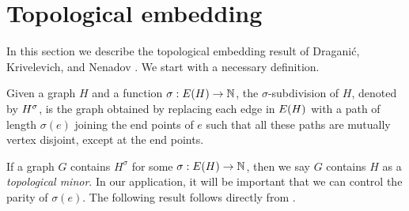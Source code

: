 \documentclass[11pt]{article}
\begin{document}




\section{Topological embedding}
\label{sec:embed-machinery}

In this section we describe the topological embedding result of Dragani\'c, Krivelevich, and Nenadov \cite{draganic22rolling}. We start with a necessary definition.

\begin{definition}\label{def:subdivisions}
Given a graph $H$ and a function $\sigma: E(H) \rightarrow \mathbb{N}$, the $\sigma$-subdivision of $H$, denoted by ${H}^{\sigma}$, is the graph obtained by replacing each edge in $E(H)$ with a path of length $\sigma(e)$ joining the end points of $e$ such that all these paths are mutually vertex disjoint, except at the end points.
\end{definition}

If a graph $G$ contains $H^{\sigma}$ for some $\sigma: E(H) \to \mathbb{N}$, then we say $G$ contains $H$ as a \emph{topological minor}. In our application, it will be important that we can control the parity of $\sigma(e)$. The following result follows directly from \cite[Theorem 1]{draganic22rolling}. 

\end{document}
